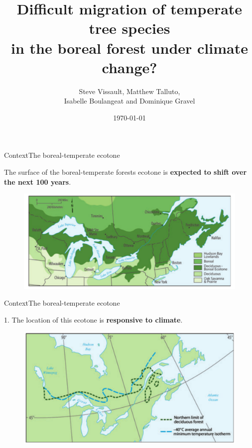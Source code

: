 \documentclass[10pt,aspectratio=149]{beamer}
\author{Steve Vissault, Matthew Talluto, \\
Isabelle Boulangeat and Dominique Gravel}
\title{Difficult migration of temperate tree species \\
in the boreal forest under climate change?}
\date{\today}
\institute{Université du Québec à Rimouski}
\begin{document}
\begin{frame}[plain]
   \titlepage
\end{frame}



\begin{frame}{Context}{The boreal-temperate ecotone}

The surface of the boreal-temperate forests ecotone is \textbf{expected to shift over the next 100 years}.

\begin{figure}
	\includegraphics[width=.70\paperwidth]{Figs/ecotone.pdf}
\end{figure}

\end{frame}




\begin{frame}{Context}{The boreal-temperate ecotone}

1. The location of this ecotone is \textbf{responsive to climate}.

\begin{figure}
	\includegraphics[width=.70\paperwidth]{Figs/climecotone.png}
\end{figure}

\end{frame}
\end{document}
